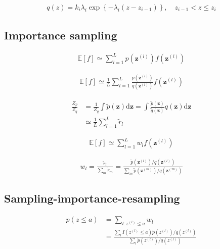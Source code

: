 \documentclass{article}
\begin{document}
\begin{align*}
q(z)=k_{i} \lambda_{i} \exp \left\{-\lambda_{i}\left(z-z_{i-1}\right)\right\}, \quad z_{i-1}<z \leqslant z_{i}
\tag{14.17}
\end{align*}

\subsection{Importance sampling}

\begin{align*}
\mathbb{E}[
f]
\simeq \sum_{l=1}^{L} p\left(\mathbf{z}^{(l)}\right) f\left(\mathbf{z}^{(l)}\right)
\tag{14.18}
\end{align*}

\begin{align*}
\mathbb{E}[
f]
\simeq \frac{1}{L} \sum_{l=1}^{L} \frac{p\left(\mathbf{z}^{(l)}\right)}{q\left(\mathbf{z}^{(l)}\right)} f\left(\mathbf{z}^{(l)}\right)
\tag{14.19}
\end{align*}

\begin{align*}
\frac{Z_{p}}{Z_{q}} & =\frac{1}{Z_{q}} \int \widetilde{p}(\mathbf{z}) \mathrm{d} \mathbf{z}=\int \frac{\widetilde{p}(\mathbf{z})}{\widetilde{q}(\mathbf{z})} q(\mathbf{z}) \mathrm{d} \mathbf{z} \\
& \simeq \frac{1}{L} \sum_{l=1}^{L} \widetilde{r}_{l}
\tag{14.21}
\end{align*}

\begin{align*}
\mathbb{E}[
f]
\simeq \sum_{l=1}^{L} w_{l} f\left(\mathbf{z}^{(l)}\right)
\tag{14.22}
\end{align*}

\begin{align*}
w_{l}=\frac{\widetilde{r}_{l}}{\sum_{m} \widetilde{r}_{m}}=\frac{\widetilde{p}\left(\mathbf{z}^{(l)}\right) / q\left(\mathbf{z}^{(l)}\right)}{\sum_{m} \widetilde{p}\left(\mathbf{z}^{(m)}\right) / q\left(\mathbf{z}^{(m)}\right)}
\tag{14.23}
\end{align*}

\subsection{Sampling-importance-resampling}

\begin{align*}
p(z \leqslant a) & =\sum_{l: z^{(l)} \leqslant a} w_{l} \\
& =\frac{\sum_{l} I\left(z^{(l)} \leqslant a\right) \widetilde{p}\left(z^{(l)}\right) / q\left(z^{(l)}\right)}{\sum_{l} \widetilde{p}\left(z^{(l)}\right) / q\left(z^{(l)}\right)}
\tag{14.24}
\end{align*}
\end{document}
